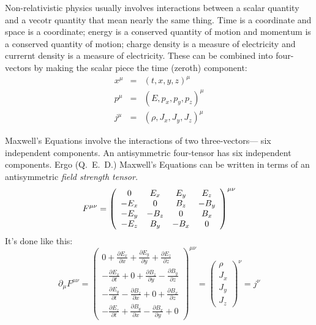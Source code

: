\documentclass[12pt]{article}
\begin{document}
Non-relativistic physics usually involves interactions between a
scalar quantity and a vecotr quantity that mean nearly the same thing.
Time is a coordinate and space is a coordinate; energy is a conserved
quantity of motion and momentum is a conserved quantity of motion;
charge density is a measure of electricity and currernt density is a
measure of electricity.  These can be combined into four-vectors by
making the scalar piece the time (zeroth) component:
\begin{eqnarray}
  x^\mu &=& (t,x,y,z)^\mu \\
  p^\mu &=& (E,p_x,p_y,p_z)^\mu \\
  j^\mu &=& (\rho, J_x, J_y, J_z)^\mu
\end{eqnarray}

Maxwell's Equations involve the interactions of two three-vectors---
six independent components.  An antisymmetric four-tensor has six
independent components.  Ergo (Q.\ E.\ D.) Maxwell's Equations can be
written in terms of an antisymmetric {\it field strength tensor.}
\begin{equation}
  F^{\mu\nu} = \left(\begin{array}{c c c c}
0 & E_x & E_y & E_z \\
-E_x & 0 & B_z & -B_y \\
-E_y & -B_z & 0 & B_x \\
-E_z & B_y & -B_x & 0
\end{array}\right)^{\mu\nu}
\end{equation}
It's done like this:
\begin{equation}
  \partial_\mu F^{\mu\nu} = \left(\begin{array}{c}
\displaystyle 0 + \frac{\partial E_x}{\partial x} + \frac{\partial E_y}{\partial y} + \frac{\partial E_z}{\partial z} \\
\displaystyle -\frac{\partial E_x}{\partial t} + 0 + \frac{\partial B_z}{\partial y} - \frac{\partial B_y}{\partial z} \\
\displaystyle -\frac{\partial E_y}{\partial t} - \frac{\partial B_z}{\partial x} + 0 + \frac{\partial B_x}{\partial z} \\
\displaystyle -\frac{\partial E_z}{\partial t} + \frac{\partial B_y}{\partial x} - \frac{\partial B_x}{\partial y} + 0
  \end{array}\right)^{\mu\nu}
= \left(\begin{array}{c} \rho \\ J_x \\ J_y \\ J_z \end{array}\right)^\nu = j^\nu
\end{equation}
\end{document}
